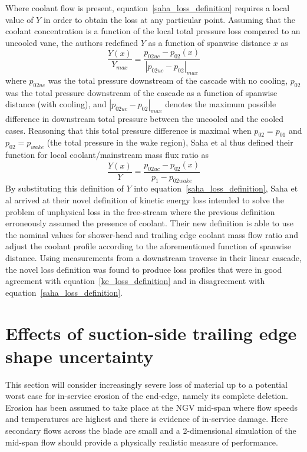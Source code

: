 \documentclass[a4paper, 11pt, oneside]{report}
\begin{document}
Where coolant flow is present, equation~\ref{saha_loss_definition} requires a local value of $Y$ in order to obtain the loss at any particular point. Assuming that the coolant concentration is a function of the local total pressure loss compared to an uncooled vane, the authors redefined $Y$ as a function of spanwise distance $x$ as
\begin{equation}
\frac{Y\left(x\right)}{Y_{max}}
=
\frac{
	p_{02uc} - p_{02}\left(x\right)
}{
	\left| p_{02uc} - p_{02} \right|_{max}
}
\end{equation}
where $p_{02uc}$ was the total pressure downstream of the cascade with no cooling, $p_{02}$ was the total pressure downstream of the cascade as a function of spanwise distance (with cooling), and $\left| p_{02uc} - p_{02} \right|_{max}$ denotes the maximum possible difference in downstream total pressure between the uncooled and the cooled cases. Reasoning that this total pressure difference is maximal when $p_{02}=p_{01}$ and $p_{02}=p_{wake}$ (the total pressure in the wake region), Saha et al thus defined their function for local coolant/mainstream mass flux ratio as
\begin{equation}
\frac{Y\left(x\right)}{Y}
=
\frac{
	p_{02uc} - p_{02}\left(x\right)
}{
	p_1 - p_{02wake}
}
\end{equation}
By substituting this definition of $Y$ into equation~\ref{saha_loss_definition}, Saha et al arrived at their novel definition of kinetic energy loss intended to solve the problem of unphysical loss in the free-stream where the previous definition erroneously assumed the presence of coolant. Their new definition is able to use the nominal values for shower-head and trailing edge coolant mass flow ratio and adjust the coolant profile according to the aforementioned function of spanwise distance. Using measurements from a downstream traverse in their linear cascade, the novel loss definition was found to produce loss profiles that were in good agreement with equation~\ref{ke_loss_definition} and in disagreement with equation~\ref{saha_loss_definition}.


\section{Effects of suction-side trailing edge shape uncertainty}
\label{suction_side_cutbacks}

This section will consider increasingly severe loss of material up to a potential worst case for in-service erosion of the end-edge, namely its complete deletion. Erosion has been assumed to take place at the NGV mid-span where flow speeds and temperatures are highest and there is evidence of in-service damage. Here secondary flows across the blade are small and a 2-dimensional simulation of the mid-span flow should provide a physically realistic measure of performance.
\end{document}
